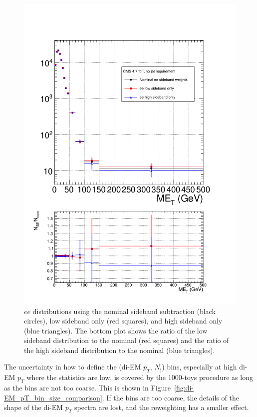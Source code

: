 \documentclass[dissertation_bw.tex]{subfiles}
\begin{document}
\begin{figure}
	\centering
	\includegraphics[scale=0.4]{mee_bkg_shape_error}
	\caption{$ee$ \MET distributions using the nominal sideband subtraction (black circles), low sideband only (red squares), and high sideband only (blue triangles).  The bottom plot shows the ratio of the low sideband distribution to the nominal (red squares) and the ratio of the high sideband distribution to the nominal (blue triangles).}
	\label{fig:mee_bkg_shape_error}
\end{figure}

The uncertainty in how to define the (di-EM $p_{T}$, $N_{\mathrm{j}}$) bins, especially at high di-EM $p_{T}$ where the statistics are low, is covered by the 1000-toys procedure as long as the bins are not too coarse.  This is shown in Figure~\ref{fig:di-EM_pT_bin_size_comparison}.  If the bins are too coarse, the details of the shape of the di-EM $p_{T}$ spectra are lost, and the reweighting has a smaller effect.
\end{document}
